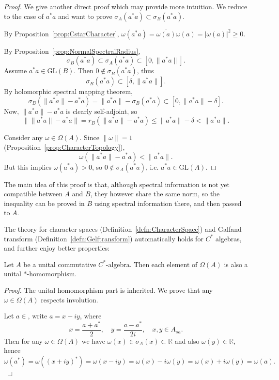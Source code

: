 \begin{proof}
	We give another direct proof which may provide more intuition. We reduce to the case of $a^* a$ and want to prove $\sigma_A(a^* a) \subset \sigma_B(a^* a)$. 

	By Proposition~\ref{prop:CstarCharacter}, $\omega(a^* a) = \overline{\omega(a)}  \omega(a) = |\omega(a)|^2 \ge 0$.

	By Proposition~\ref{prop:NormalSpectralRadius}, 
	\[
		\sigma_B(a^* a) \subset \sigma_A(a^* a) \subset [0,\|a^*a\|]
	.\] 
	Assume $a^* a \in \text{GL}(B)$. Then $0 \not\in \sigma_B(a^* a)$, thus
	\[
		\sigma_B(a^* a) \subset [\delta, \|a^* a\|]
	.\] 
	By holomorphic spectral mapping theorem,
	\[
		\sigma_B(\|a^* a\| - a^* a) = \|a^* a\| - \sigma_B(a^* a) \subset [0, \|a^* a\| - \delta]
	.\] 
	Now, $\|a^* a\| - a^* a$ is clearly self-adjoint, so
	\[
		\| \|a^* a\| - a^* a\| = r_B(\|a^* a\| - a^* a) \le  \|a^* a\| - \delta < \|a^* a\|
	.\] 

	Consider any $\omega \in \Omega(A)$. Since $\|\omega\| = 1$ (Proposition~\ref{prop:CharacterTopology}), 
	\[
		\omega\left( \|a^* a\| - a^* a \right) < \|a^* a\|
	.\] 
	But this implies $\omega(a^* a) > 0$, so $0 \not\in \sigma_A(a^* a)$, i.e. $a^* a \in \text{GL}(A)$.
\end{proof}
The main idea of this proof is that, although spectral information is not yet compatible between $A$ and $B$, they however share the same norm, so the inequality can be proved in $B$ using spectral information there, and then passed to $A$.

The theory for character spaces (Definition~\ref{defn:CharacterSpace}) and Galfand transform (Definition~\ref{defn:Gelftransform}) automatically holds for $C^*$ algebras, and further enjoy better properties:

\begin{proposition}
	\label{prop:CstarCharacter}
	Let $A$ be a unital commutative $C^*$-algebra. Then each element of $\Omega(A)$ is also a unital $*$-homomorphism.
\end{proposition}
\begin{proof}
	The unital homomorphism part is inherited. We prove that any $\omega \in \Omega(A)$ respects involution.

	Let $a \in $, write $a = x + i y$, where
	\[
		x = \frac{a + a^*}{2}, \quad y = \frac{a - a^*}{2 i}, \quad x, y \in A_{sa}
	.\] 
	Then for any $\omega \in \Omega(A)$ we have $\omega(x) \in \sigma_A(x) \subset \mathbb{R}$ and also $\omega(y) \in \mathbb{R}$, hence
	\[
		\omega(a^*) = \omega((x + i y)^*) = \omega(x - i y) = \omega(x) - i \omega(y) = \overline{\omega(x) + i \omega(y)}  = \overline{\omega(a)} 
	.\] 
\end{proof}

